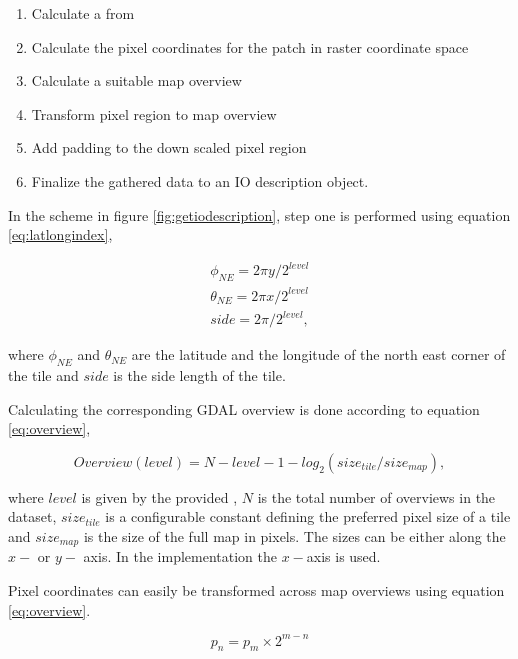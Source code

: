\begin{enumerate}
\item Calculate a  from 
\item Calculate the pixel coordinates for the patch in raster coordinate space
\item Calculate a suitable map overview
\item Transform pixel region to map overview
\item Add padding to the down scaled pixel region
\item Finalize the gathered data to an IO description object.
\end{enumerate}

In the scheme in figure \ref{fig:getiodescription}, step one is performed using equation \ref{eq:latlongindex},

\begin{equation}
\label{eq:latlongindex}
\begin{split}
\phi_{NE} = 2\pi y / 2^{level} \\
\theta_{NE} = 2\pi x / 2^{level} \\
side = 2\pi / 2^{level},
\end{split} 
\end{equation}

where $\phi_{NE}$ and $\theta_{NE}$ are the latitude and the longitude of the north east corner of the tile and $side$ is the side length of the tile.

Calculating the corresponding GDAL overview is done according to equation \ref{eq:overview},

\begin{equation}
\label{eq:overview}
Overview(level) = N - level - 1 - log_2(size_{tile} / size_{map}),
\end{equation}

where $level$ is given by the provided , $N$ is the total number of overviews in the dataset, $size_{tile}$ is a configurable constant defining the preferred pixel size of a tile and $size_{map}$ is the size of the full map in pixels. The sizes can be either along the $x-$ or $y-$ axis. In the implementation the $x-$axis is used.

Pixel coordinates can easily be transformed across map overviews using equation \ref{eq:overview}.

\begin{equation}
\label{eq:overview}
p_{n} = p_{m} \times 2^{m-n}
\end{equation}

